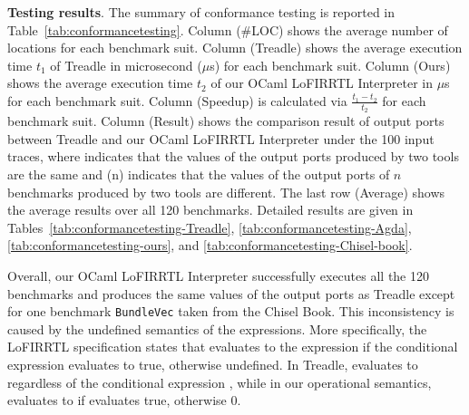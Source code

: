 \smallskip\noindent
{\bf Testing results}.
The summary of conformance testing is reported in Table~\ref{tab:conformancetesting}.
Column (\#LOC) shows the average number of locations for each benchmark suit.
Column (Treadle) shows the average execution time $t_1$ of Treadle in microsecond ($\mu$s) for each benchmark suit.
Column (Ours) shows the average execution time $t_2$ of our OCaml LoFIRRTL Interpreter in $\mu$s for each benchmark suit.
Column (Speedup) is calculated via $\frac{t_1-t_2}{t_2}$ for each benchmark suit.
Column (Result) shows the comparison result of output ports between Treadle and our OCaml LoFIRRTL Interpreter under the 100 input traces,
where  indicates that the values of the output ports produced by two tools are the same and (n) indicates
that the values of the output ports of $n$ benchmarks produced by two tools are different.
The last row (Average) shows the average results over all 120 benchmarks.
Detailed results are given in Tables~\ref{tab:conformancetesting-Treadle}, \ref{tab:conformancetesting-Agda}, \ref{tab:conformancetesting-ours}, and \ref{tab:conformancetesting-Chisel-book}.

Overall, our OCaml LoFIRRTL Interpreter successfully executes all the 120 benchmarks
and produces the same values of the output ports as Treadle except for one benchmark \texttt{BundleVec} taken from the Chisel Book.
This inconsistency is caused by the undefined semantics of the  expressions.
More specifically, the LoFIRRTL specification states that  evaluates to the expression 
if the conditional expression  evaluates to true, otherwise undefined.
In Treadle,   evaluates to 
 regardless of the conditional expression , while
 in our operational semantics,  evaluates to 
if  evaluates true, otherwise $0$.


